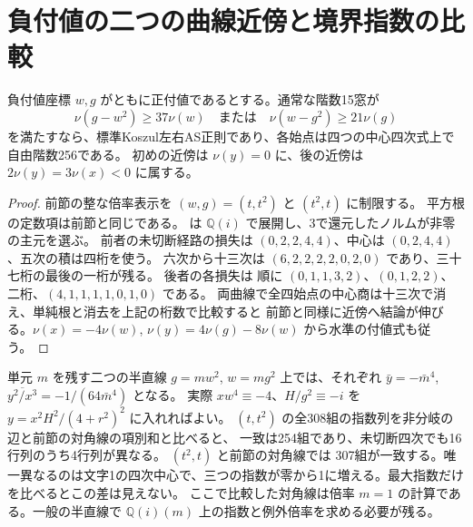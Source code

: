 \section{負付値の二つの曲線近傍と境界指数の比較}
\label{sec:rank-fifteen-negative-x-arcs}
\begin{proposition}\label{prop:rank-fifteen-negative-x-arcs}
負付値座標 $w,g$ がともに正付値であるとする。通常な階数15窓が
\[
   \nu(g-w^2)\ge37\nu(w)\quad\text{または}\quad
   \nu(w-g^2)\ge21\nu(g)
\]
を満たすなら、標準Koszul左右AS正則であり、各始点は四つの中心四次式上で自由階数256である。
初めの近傍は $\nu(y)=0$ に、後の近傍は $2\nu(y)=3\nu(x)<0$ に属する。
\end{proposition}
\begin{proof}
前節の整な倍率表示を $(w,g)=(t,t^2)$ と $(t^2,t)$ に制限する。
平方根の定数項は前節と同じである。
 は
$\mathbb Q(i)$ で展開し、3で還元したノルムが非零の主元を選ぶ。
前者の未切断経路の損失は $(0,2,2,4,4)$、中心は $(0,2,4,4)$、五次の積は四桁を使う。
六次から十三次は $(6,2,2,2,2,0,2,0)$ であり、三十七桁の最後の一桁が残る。
後者の各損失は 順に $(0,1,1,3,2)$、$(0,1,2,2)$、二桁、$(4,1,1,1,1,0,1,0)$ である。
両曲線で全四始点の中心商は十三次で消え、単純根と消去を上記の桁数で比較すると
前節と同様に近傍へ結論が伸びる。$\nu(x)=-4\nu(w)$,
$\nu(y)=4\nu(g)-8\nu(w)$ から水準の付値式も従う。
\end{proof}

単元 $m$ を残す二つの半直線 $g=mw^2$, $w=mg^2$ 上では、それぞれ
$\bar y=-\bar m^4$, $\overline{y^2/x^3}=-1/(64\bar m^4)$ となる。
実際 $xw^4\equiv-4$、$H/g^2\equiv-i$ を $y=x^2H^2/(4+r^2)^2$ に入れればよい。
$(t,t^2)$ の全308組の指数列を非分岐の辺と前節の対角線の項別和と比べると、
一致は254組であり、未切断四次でも16行列のうち4行列が異なる。
$(t^2,t)$ と前節の対角線では 307組が一致する。唯一異なるのは文字1の四次中心で、三つの指数が零から1に増える。最大指数だけを比べるとこの差は見えない。
ここで比較した対角線は倍率 $m=1$ の計算である。一般の半直線で
$\mathbb Q(i)(m)$ 上の指数と例外倍率を求める必要が残る。
